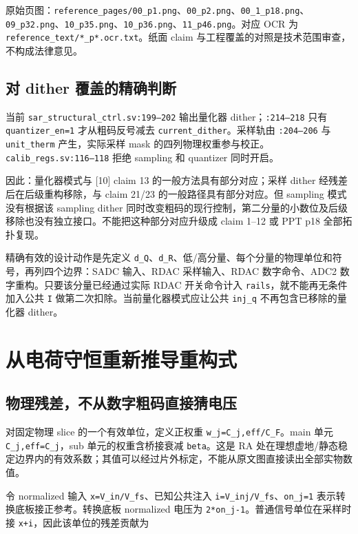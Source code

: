 \documentclass[UTF8,fontset=fandol,10pt,a4paper,openany]{ctexrep}
\newcommand{\code}[1]{\nolinkurl{#1}}
\begin{document}
原始页图：\code{reference_pages/00_p1.png}、\code{00_p2.png}、\code{00_1_p18.png}、\code{09_p32.png}、\code{10_p35.png}、\code{10_p36.png}、\code{11_p46.png}。对应 OCR 为 \code{reference_text/*_p*.ocr.txt}。纸面 claim 与工程覆盖的对照是技术范围审查，不构成法律意见。


\subsection{对 dither 覆盖的精确判断}


当前 \code{sar_structural_ctrl.sv:199–202} 输出量化器 dither；\code{:214–218} 只有 \code{quantizer_en=1} 才从粗码反号减去 \code{current_dither}。采样轨由 \code{:204–206} 与 \code{unit_therm} 产生，实际采样 mask 的四列物理权重参与校正。\code{calib_regs.sv:116–118} 拒绝 sampling 和 quantizer 同时开启。


因此：量化器模式与 [10] claim 13 的一般方法具有部分对应；采样 dither 经残差后在后级重构移除，与 claim 21/23 的一般路径具有部分对应。但 sampling 模式没有根据该 sampling dither 同时改变粗码的现行控制，第二分量的小数位及后级移除也没有独立接口。不能把这种部分对应升级成 claim 1–12 或 PPT p18 全部拓扑复现。


精确有效的设计动作是先定义 \code{d_Q}、\code{d_R}、低/高分量、每个分量的物理单位和符号，再列四个边界：SADC 输入、RDAC 采样输入、RDAC 数字命令、ADC2 数字重构。只要该分量已经通过实际 RDAC 开关命令计入 \code{rails}，就不能再无条件加入公共 \code{I} 做第二次扣除。当前量化器模式应让公共 \code{inj_q} 不再包含已移除的量化器 dither。


\section{从电荷守恒重新推导重构式}


\subsection{物理残差，不从数字粗码直接猜电压}


对固定物理 slice 的一个有效单位，定义正权重 \code{w_j=C_j,eff/C_F}。main 单元 \code{C_j,eff=C_j}，sub 单元的权重含桥接衰减 \code{beta}。这是 RA 处在理想虚地/静态稳定边界内的有效系数；其值可以经过片外标定，不能从原文图直接读出全部实物数值。


令 normalized 输入 \code{x=V_in/V_fs}、已知公共注入 \code{i=V_inj/V_fs}、\code{on_j=1} 表示转换底板接正参考。转换底板 normalized 电压为 \code{2*on_j-1}。普通信号单位在采样时接 \code{x+i}，因此该单位的残差贡献为
\end{document}
